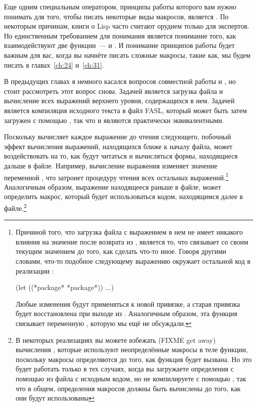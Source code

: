 Еще одним специальным оператором, принципы работы которого вам нужно понимать для того,
чтобы писать некоторые виды макросов, является .  По некоторым причинам,
книги о Lisp часто считают  орудием только для экспертов.  Но единственным
требованием для понимания  является понимание того, как взаимодействуют
две функции~---  и .  И понимание принципов работы
 будет важным для вас, когда вы начнёте писать сложные макросы, такие как,
мы будем писать в главах~\ref{ch:24} и~\ref{ch:31}.

В предыдущих главах я немного касался вопросов совместной работы  и
, но стоит рассмотреть этот вопрос снова.  Задачей  является
загрузка файла и вычисление всех выражений верхнего уровня, содержащихся в нем.  Задачей
 является компиляция исходного текста в файл FASL, который может быть
затем загружен с помощью , так что  и  являются практически эквивалентными.

Поскольку  вычисляет каждое выражение до чтения следующего, побочный эффект
вычисления выражений, находящихся ближе к началу файла, может воздействовать на то, как
будут читаться и вычисляться формы, находящиеся дальше в файле.  Например, вычисление
выражения  изменяет значение переменной , что затронет
процедуру чтения всех остальных выражений.\footnote{Причиной того, что загрузка файла с
  выражением  в нем не имеет никакого влияния на значение
   после возврата из , является то, что  связывает
   со своим текущим значением до того, как сделать что-то иное.  Говоря
  другими словами, что-то подобное следующему выражению  окружает остальной код
  в реализации :

\begin{myverb}
(let ((*package* *package*)) ...)
\end{myverb}

Любые изменения  будут применяться к новой привязке, а старая привязка
будет восстановлена при выходе из .  Аналогичным образом, эта функция связывает
переменную , которую мы ещё не обсуждали.}  Аналогичным образом,
выражение  находящееся раньше в файле, может определить макрос, который
будет использоваться кодом, находящимся далее в файле.\footnote{В некоторых реализациях вы
  можете избежать (FIXME get away) вычисления , которые используют
  неопределённые макросы в теле функции, поскольку макросы определяются до того, как
  функция будет вызвана.  Но это будет работать только в тех случаях, когда вы загружаете
  определения с помощью  из файла с исходным кодом, но не компилируете с
  помощью , так что в общем, определения макросов должны быть вычислены
  до того, как они будут использованы}

